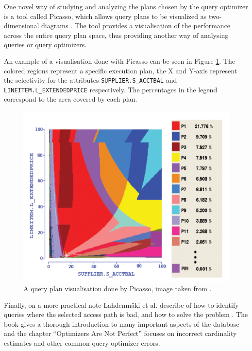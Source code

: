 One novel way of studying and analyzing the plans chosen by the query optimizer is a tool called Picasso, which allows query plans to be visualized as two-dimensional diagrams \cite{haritsa_2010_picasso_tpdqov}. The tool provides a visualisation of the performance across the entire query plan space, thus providing another way of analysing queries or query optimizers.

An example of a visualisation done with Picasso can be seen in Figure \ref{fig:picasso}. The colored regions represent a specific execution plan, the X and Y-axis represent the selectivity for the attributes \texttt{SUPPLIER.S\_ACCTBAL} and \texttt{LINEITEM.L\_EXTENDEDPRICE} respectively. The percentages in the legend correspond to the area covered by each plan.

\begin{figure}[ht]
\includegraphics[scale=0.6]{Images/Picasso.png}
\caption[A query plan visualisation done by Picasso]{A query plan visualisation done by Picasso, image taken from \cite{haritsa_2010_picasso_tpdqov}.}\label{fig:picasso}
\end{figure}

Finally, on a more practical note Lahdenmäki et al. describe of how to identify queries where the selected access path is bad, and how to solve the problem \cite{lahdenmaki_2005_relational_rdidatodossea}. The book gives a thorough introduction to many important aspects of the database and the chapter ``Optimizers Are Not Perfect'' focuses on incorrect cardinality estimates and other common query optimizer errors.

